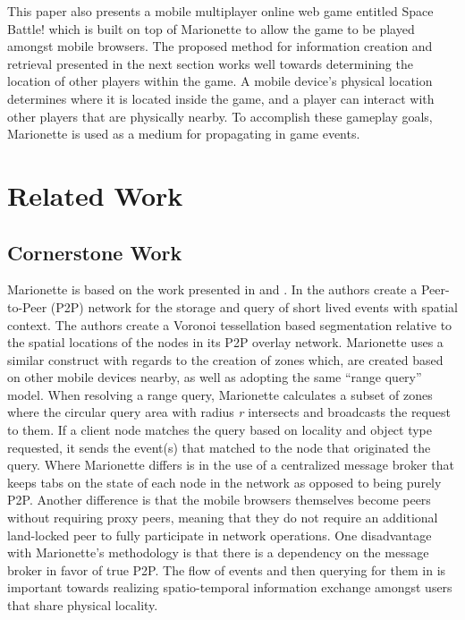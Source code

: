 \documentclass[12pt]{report}	%
\theoremstyle{definition}
\theoremstyle{remark}
\begin{document}
This paper also presents a mobile multiplayer online web game entitled
Space Battle! which is built on top of Marionette to allow the game to be played amongst 
mobile browsers. The proposed method for information creation and retrieval 
presented in the next section works well towards determining the location of other 
players within the game. 
A mobile device's physical location determines where it is located inside 
the game, and a player can interact with other players
that are physically nearby. To accomplish these gameplay
goals, Marionette is used as a medium for propagating in game events.

\chapter{Related Work}

\section{Cornerstone Work}

Marionette is based on the work presented in
\cite{zio2011p2p} and
\cite{yoneki2007socio}. In
\cite{zio2011p2p} the authors create a Peer-to-Peer
(P2P) network for the storage and query of short lived events with
spatial context. The authors create a Voronoi tessellation based
segmentation relative to the spatial locations of the nodes in its P2P
overlay network. Marionette uses a similar construct with regards to the
creation of zones which, are created based on other mobile devices nearby, as well
as adopting the same ``range query'' model. When resolving a range query,
Marionette calculates a subset of zones where the circular query area with 
radius \textit{r} intersects and broadcasts the request to them. If a client 
node matches the query based on locality and object type requested,
it sends the event(s) that matched to the node that originated the
query. Where Marionette
differs is in the use of a centralized message broker
that keeps tabs on the state of each node in the network as opposed to
being purely P2P. Another difference is that the mobile browsers
themselves become peers without requiring proxy peers, meaning that they 
do not require an additional land-locked peer to fully participate in network operations.
One disadvantage with Marionette's methodology is that there is a
dependency on the message broker in favor of true P2P. The flow of
events and then querying for them in \cite{zio2011p2p}
is important towards realizing spatio-temporal information exchange
amongst users that share physical locality.
\end{document}
